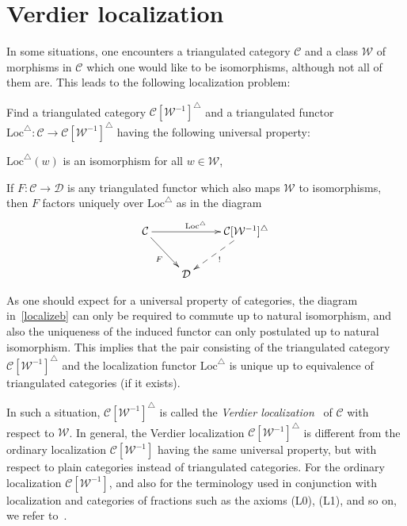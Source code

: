 \documentclass{amsproc}
\theoremstyle{definition}
\begin{document}
\section{Verdier localization}

In some situations, one encounters a triangulated category ${\mathcal{C}}$ and a class ${\mathcal{W}}$ of morphisms in ${\mathcal{C}}$ which one would like to be isomorphisms, although not all of them are. This leads to the following localization problem:

Find a triangulated category ${\mathcal{C}}[{\mathcal{W}}^{-1}]^\triangle$ and a triangulated functor ${\mathrm{Loc}}^\triangle:{\mathcal{C}}{\longrightarrow}{\mathcal{C}}[{\mathcal{W}}^{-1}]^\triangle$ having the following universal property:
\begin{compactenum}
\item ${\mathrm{Loc}}^\triangle(w)$ is an isomorphism for all $w\in{\mathcal{W}}$,
\item\label{localizeb} If $F:{\mathcal{C}}{\longrightarrow}{\mathcal{D}}$ is any triangulated functor which also maps ${\mathcal{W}}$ to isomorphisms, then $F$ factors uniquely over ${\mathrm{Loc}}^\triangle$ as in the diagram
\begin{displaymath}
\xymatrix{{}{\mathcal{C}}\ar[rr]^{{\mathrm{Loc}}^\triangle}\ar[rd]_F & & {}{\mathcal{C}}[{\mathcal{W}}^{-1}]^\triangle\ar@{-->}[ld]^{!} \\
& {}{\mathcal{D}} & }
\end{displaymath}
\end{compactenum}
As one should expect for a universal property of categories, the diagram in~\ref{localizeb} can only be required to commute up to natural isomorphism, and also the uniqueness of the induced functor can only postulated up to natural isomorphism. This implies that the pair consisting of the triangulated category ${\mathcal{C}}[{\mathcal{W}}^{-1}]^\triangle$ and the localization functor ${\mathrm{Loc}}^\triangle$ is unique up to equivalence of triangulated categories (if it exists).

In such a situation, ${\mathcal{C}}[{\mathcal{W}}^{-1}]^\triangle$ is called the \emph{Verdier localization}~\cite{Ver} of ${\mathcal{C}}$ with respect to ${\mathcal{W}}$. In general, the Verdier localization ${\mathcal{C}}[{\mathcal{W}}^{-1}]^\triangle$ is different from the ordinary localization ${\mathcal{C}}[{\mathcal{W}}^{-1}]$ having the same universal property, but with respect to plain categories instead of triangulated categories. For the ordinary localization ${\mathcal{C}}[{\mathcal{W}}^{-1}]$, and also for the terminology used in conjunction with localization and categories of fractions such as the axioms (L0), (L1), and so on, we refer to~\cite{Fri1}.
\end{document}

